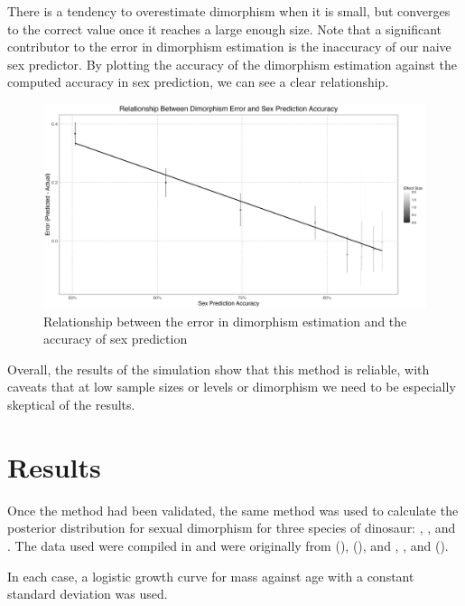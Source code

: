 \documentclass[letterpaper]{article}
\begin{document}
There is a tendency to overestimate dimorphism when it is small, but converges to the correct value once it reaches a large enough size. Note that a significant contributor to the error in dimorphism estimation is the inaccuracy of our naive sex predictor. By plotting the accuracy of the dimorphism estimation against the computed accuracy in sex prediction, we can see a clear relationship.

\begin{figure}[H]
	\centering
	\includegraphics[width = \textwidth]{images/alligatorSexPredictionAccuracyDimorphismError.png}
	\caption{Relationship between the error in dimorphism estimation and the accuracy of sex prediction}
	\label{fig:alligatorSexPredictionError}
\end{figure}

Overall, the results of the simulation show that this method is reliable, with caveats that at low sample sizes or levels or dimorphism we need to be especially skeptical of the results.


\section{Results}

Once the method had been validated, the same method was used to calculate the posterior distribution for sexual dimorphism for three species of dinosaur: \maia{}, \psit{}, and \tyran{}. The data used were compiled in \cite{saittaEffectSizeStatistical2020} and were originally from \cite{woodwardMaiasauraModelOrganism2015} (\maia), \cite{ericksonFlawedAnalysisResponse2015}  (\psit), and \cite{ericksonGigantismComparativeLifehistory2004}, \cite{hornerAgeGrowthDynamics2004}, and \cite{leeSexualMaturityGrowing2008} (\tyran).

In each case, a logistic growth curve for mass against age with a constant standard deviation was used.
\end{document}
